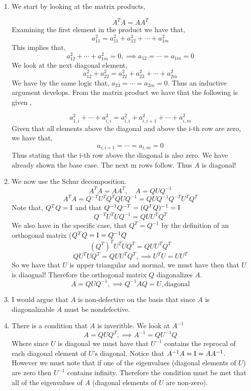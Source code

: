 \documentclass{article}
\begin{document}
\begin{enumerate}
\item
We start by looking at the matrix products, 

\[
    A^T A = AA^T
\] 
Examining the first element in the product we have that, 
\[
    a_{11}^2  = a_{11}^2 + a_{12}^2 + \cdots + a_{1m}^2 
\]
This implies that, 
\[
    a_{12}^2 + \cdots + a_{1m}^2 = 0, \implies a_{12} = \cdots = a_{1m} = 0 
\]
We look at the next diagonal element, 
\[
    a_{12}^2 + a_{22}^2 = a_{22}^2 + a_{23}^2 + \cdots + a_{2m}^2
\]
We have by the same logic that, $a_{23} = \cdots = a_{2m} = 0$. 
Thus an inductive argument develops. From the matrix product we have that the following is given , 

\[
    a_{1, i}^2 + \cdots + a_{i, i}^2 = a_{i, i}^2 + a_{i, i+1}^2 + \cdots + a_{i, m}^2
\]
Given that all elements above the diagonal and above the i-th row are zero, we have that, 
\[
    a_{i, i+1} =  \cdots = a_{i, m} = 0
\]
Thus stating that the i-th row above the diagonal is also zero. We have already shown the base case. The next m rows follow. Thus $A$ is diagonal! 
\item
We now use the Schur decomposition. 
\[
    A^TA = AA^T, \quad A = QUQ^{-1}
\]
\[
    A^TA = Q^{-T}U^TQ^TQUQ^{-1} = QUQ^{-1}Q^{-T}U^TQ^T
\]
Note that, $Q^TQ = \mathrm{I}$ and that $Q^{-1}Q^{-T} = (Q^TQ)^{-1} = \mathrm{I}$
\[
    Q^{-T}U^TUQ^{-1} = QUU^TQ^T
\]
We also have in the specific case, that $Q^T = Q^{-1}$ by the definition of an orthogonal matrix ($Q^TQ = \mathrm{I} = Q^{-1}Q$
\[
    (Q^T)^TU^TUQ^T = QUU^TQ^T
\]
\[
    QU^TUQ^T = QUU^TQ^T, \implies U^TU = UU^T
\]
So we have that $U$ is upper triangular and normal, we must have then that $U$ is diaognal! Therefore the orthogonal matrix $Q$ diagonalizes $A$. 
\[
    A = QUQ^{-1}, \implies Q^{-1}AQ = U, \text{diagonal}
\]
\item 
I would argue that $A$ is non-defective on the basis that since $A$ is diagonalizable $A$ must be nondefective. 

\item 
There is a condition that $A$ is inveritble. We look at $A^{-1}$
\[
    A = QUQ^T, \implies A^{-1} = QU^{-1}Q
\]
Where since $U$ is diagonal we must have that $U^{-1}$ contains the reprocal of each diagonal element of $U$'s diagonal.  
Notice that $A^{-1}A = \mathrm{I} = AA^{-1}$. However we must note that if one of the eigenvalues (diagonal elements of $U$) are zero then $U^{-1}$ contains infinity. Therefore the condition must be met that all of the eigenvalues of $A$ (diagonal elements of $U$ are non-zero). 

\end{enumerate}
\end{document}
